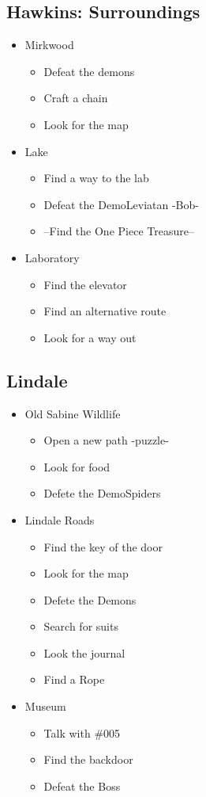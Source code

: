 \subsection{Hawkins: Surroundings}
\begin{itemize}
	\item Mirkwood
	\begin{itemize}
		\item Defeat the demons
		\item Craft a chain
		\item Look for the map
	\end{itemize}
	\item Lake
	\begin{itemize}
		\item Find a way to the lab
		\item Defeat the DemoLeviatan -Bob-
		\item --Find the One Piece Treasure--
	\end{itemize}
	\item Laboratory
	\begin{itemize}
		\item Find the elevator
		\item Find an alternative route
		\item Look for a way out
	\end{itemize}
\end{itemize}

\subsection{Lindale}
\begin{itemize}
	\item Old Sabine Wildlife
	\begin{itemize}
		\item Open a new path -puzzle-
		\item Look for food
		\item Defete the DemoSpiders
	\end{itemize}
	\item Lindale Roads
	\begin{itemize}	
		\item Find the key of the door
		\item Look for the map
		\item Defete the Demons
		\item Search for suits
		\item Look the journal
		\item Find a Rope
	\end{itemize}
	\item Museum
	\begin{itemize}
		\item Talk with \#005
		\item Find the backdoor
		\item Defeat the Boss
	\end{itemize}
\end{itemize}

